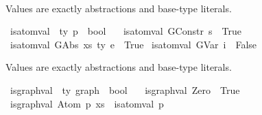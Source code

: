 \begin{isabellebody}
\ \ %
%
\isadelimdocument
%
\endisadelimdocument
%
\isatagdocument
%
\isamarkuptrue%
%
\endisatagdocument
{\isafolddocument}%
%
\isadelimdocument
%
\endisadelimdocument
%
\begin{isamarkuptext}%
Values are exactly abstractions and base-type literals.%
\end{isamarkuptext}\isamarkuptrue%
\isamarkupfalse%
\ is{\isacharunderscore}{\kern0pt}atom{\isacharunderscore}{\kern0pt}val\ {\isacharcolon}{\kern0pt}{\isacharcolon}{\kern0pt}\ {\isachardoublequoteopen}{\isacharprime}{\kern0pt}ty\ p\ {\isacharequal}{\kern0pt}{\isachargreater}{\kern0pt}\ bool{\isachardoublequoteclose}\ \isanewline
\ \ {\isachardoublequoteopen}is{\isacharunderscore}{\kern0pt}atom{\isacharunderscore}{\kern0pt}val\ {\isacharparenleft}{\kern0pt}GConstr\ s{\isacharparenright}{\kern0pt}\ {\isacharequal}{\kern0pt}\ True{\isachardoublequoteclose}\isanewline
{\isacharbar}{\kern0pt}\ {\isachardoublequoteopen}is{\isacharunderscore}{\kern0pt}atom{\isacharunderscore}{\kern0pt}val\ {\isacharparenleft}{\kern0pt}GAbs\ xs\ ty\ e{\isacharparenright}{\kern0pt}\ {\isacharequal}{\kern0pt}\ True{\isachardoublequoteclose}\isanewline
{\isacharbar}{\kern0pt}\ {\isachardoublequoteopen}is{\isacharunderscore}{\kern0pt}atom{\isacharunderscore}{\kern0pt}val\ {\isacharparenleft}{\kern0pt}GVar\ i{\isacharparenright}{\kern0pt}\ {\isacharequal}{\kern0pt}\ False{\isachardoublequoteclose}%
\begin{isamarkuptext}%
Values are exactly abstractions and base-type literals.%
\end{isamarkuptext}\isamarkuptrue%
\isamarkupfalse%
\ is{\isacharunderscore}{\kern0pt}graph{\isacharunderscore}{\kern0pt}val\ {\isacharcolon}{\kern0pt}{\isacharcolon}{\kern0pt}\ {\isachardoublequoteopen}{\isacharprime}{\kern0pt}ty\ graph\ {\isacharequal}{\kern0pt}{\isachargreater}{\kern0pt}\ bool{\isachardoublequoteclose}\ \isanewline
\ \ {\isachardoublequoteopen}is{\isacharunderscore}{\kern0pt}graph{\isacharunderscore}{\kern0pt}val\ Zero\ {\isacharequal}{\kern0pt}\ True{\isachardoublequoteclose}\isanewline
{\isacharbar}{\kern0pt}\ {\isachardoublequoteopen}is{\isacharunderscore}{\kern0pt}graph{\isacharunderscore}{\kern0pt}val\ {\isacharparenleft}{\kern0pt}Atom\ p\ xs{\isacharparenright}{\kern0pt}\ {\isacharequal}{\kern0pt}\ is{\isacharunderscore}{\kern0pt}atom{\isacharunderscore}{\kern0pt}val\ p{\isachardoublequoteclose}\isanewline

\end{isabellebody}
